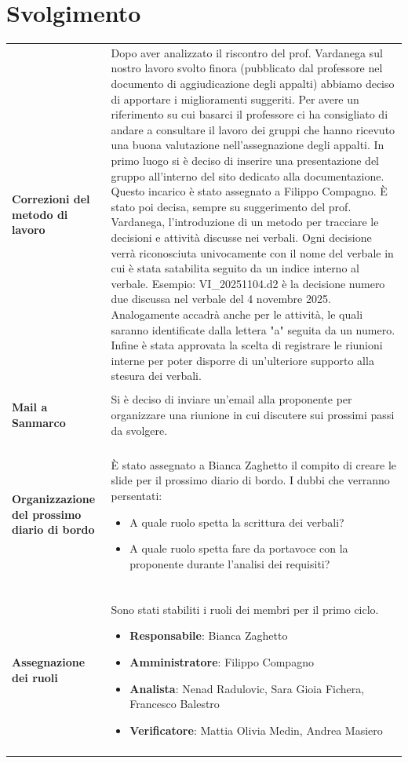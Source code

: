 \documentclass[a4paper,12pt]{article}
\begin{document}
\section{Svolgimento}
\begin{longtable}{P{5cm}|P{10cm}} 
    \textbf{Correzioni del metodo di lavoro} & Dopo aver analizzato il riscontro del prof. Vardanega sul nostro lavoro svolto finora (pubblicato dal professore nel documento di aggiudicazione degli appalti) abbiamo deciso di apportare i miglioramenti suggeriti. Per avere un riferimento su cui basarci il professore ci ha consigliato di andare a consultare il lavoro dei gruppi che hanno ricevuto una buona valutazione nell'assegnazione degli appalti. 
    In primo luogo si è deciso di inserire una presentazione del gruppo all'interno del sito dedicato alla documentazione. Questo incarico è stato assegnato a Filippo Compagno.
    È stato poi decisa, sempre su suggerimento del prof. Vardanega, l'introduzione di un metodo per tracciare le decisioni e attività discusse nei verbali. Ogni decisione verrà riconosciuta univocamente con il nome del verbale in cui è stata satabilita seguito da un indice interno al verbale. Esempio: VI\_20251104.d2 è la decisione numero due discussa nel verbale del 4 novembre 2025. Analogamente accadrà anche per le attività, le quali saranno identificate dalla lettera "a" seguita da un numero.
    Infine è stata approvata la scelta di  registrare le riunioni interne per poter disporre di un'ulteriore supporto alla stesura dei verbali.\\
    \\
    \textbf{Mail a Sanmarco} & Si è deciso di inviare un'email alla proponente per organizzare una riunione in cui discutere sui prossimi passi da svolgere.\\\\

    \textbf{Organizzazione del prossimo diario di bordo} & È stato assegnato a Bianca Zaghetto il compito di creare le slide per il prossimo diario di bordo.
    I dubbi che verranno persentati:
    \begin{itemize}
        \item A quale ruolo spetta la scrittura dei verbali?
        \item A quale ruolo spetta fare da portavoce con la proponente durante l'analisi dei requisiti?
    \end{itemize}\\\\

    \textbf{Assegnazione dei ruoli} & Sono stati stabiliti i ruoli dei membri per il primo ciclo.
    \begin{itemize}
        \item \textbf{Responsabile}: Bianca Zaghetto
        \item \textbf{Amministratore}: Filippo Compagno
        \item \textbf{Analista}: Nenad Radulovic, Sara Gioia Fichera, Francesco Balestro
        \item \textbf{Verificatore}: Mattia Olivia Medin, Andrea Masiero
    \end{itemize}\\\\
    

\end{longtable}
\end{document}
